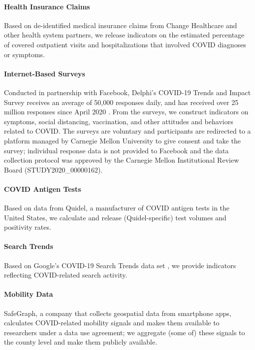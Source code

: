 \documentclass[9pt,twocolumn,twoside,lineno]{pnas-new}
\begin{document}
\paragraph{Health Insurance Claims} Based on de-identified medical insurance
claims from Change Healthcare and other health system partners, we release
indicators on the estimated percentage of covered outpatient visits and
hospitalizations that involved COVID diagnoses or symptoms.

\paragraph{Internet-Based Surveys} Conducted in partnership with Facebook,
Delphi's COVID-19 Trends and Impact Survey receives an average of 50,000
responses daily, and has received over 25 million responses since April 2020
\cite{Salomon:2021, Kreuter:2020}. From the surveys, we construct indicators on
symptoms, social distancing, vaccination, and other attitudes and behaviors
related to COVID. The surveys are voluntary and participants are redirected to a
platform managed by Carnegie Mellon University to give consent and take the
survey; individual response data is not provided to Facebook and the data
collection protocol was approved by the Carnegie Mellon Institutional Review
Board (STUDY2020\_00000162).

\paragraph{COVID Antigen Tests} Based on data from Quidel, a manufacturer of
COVID antigen tests in the United States, we calculate and release
(Quidel-specific) test volumes and positivity rates.

\paragraph{Search Trends} Based on Google's COVID-19 Search Trends data set
\cite{GoogleSymptoms}, we provide indicators reflecting COVID-related search
activity.

\paragraph{Mobility Data} SafeGraph, a company that collects geospatial data
from smartphone apps, calculates COVID-related mobility signals
\cite{SafeGraphSocial, SafeGraphPatterns} and makes them available to
researchers under a data use agreement; we aggregate (some of) these signals to
the county level and make them publicly available.
\end{document}
